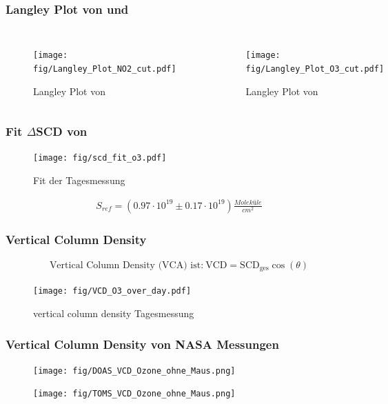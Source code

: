 \documentclass{beamer}
\begin{document}
\begin{frame}
    \frametitle{Langley Plot von  und }
    \begin{columns}
        \begin{figure}
    		\texttt{[image: fig/Langley\_Plot\_NO2\_cut.pdf]}
            \caption{Langley Plot von }   
	 	\end{figure}
 	    \begin{figure}
 	    	\texttt{[image: fig/Langley\_Plot\_O3\_cut.pdf]}
 	        \caption{Langley Plot von }
     	\end{figure} 
    \end{columns} 	
\end{frame}

\begin{frame}
    \frametitle{Fit $\Delta$SCD von }
    \begin{figure}
    	\texttt{[image: fig/scd\_fit\_o3.pdf]}
    	\caption{Fit der Tagesmessung }
    \end{figure}
	\begin{align}
		S_{ref}= (0.97 \cdot 10^{19}\pm 0.17 \cdot 10^{19}) \si{\frac{Moleküle}{cm^2}}
	\end{align}
\end{frame}

\begin{frame}
    \frametitle{Vertical Column Density }
    \begin{align}
    	\text{Vertical Column Density (VCA) ist:}\	\text{VCD} = \text{SCD}_\text{ges} \cos (\theta)
    \end{align}
    \vspace{-1cm}
    \begin{figure}
    	\texttt{[image: fig/VCD\_O3\_over\_day.pdf]}
		\caption{vertical column density Tagesmessung }    
	\end{figure}
\end{frame}

\begin{frame}
	 \frametitle{Vertical Column Density  von NASA Messungen}
	 \begin{figure}	
    	\texttt{[image: fig/DOAS\_VCD\_Ozone\_ohne\_Maus.png]}
    \end{figure}
    \begin{figure}
    	\texttt{[image: fig/TOMS\_VCD\_Ozone\_ohne\_Maus.png]}
    \end{figure}
	
\end{frame}
\end{document}
